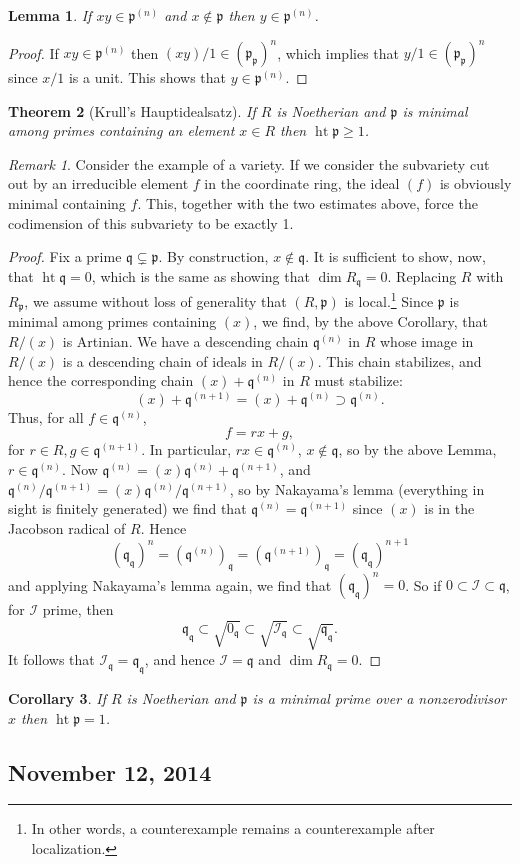 \documentclass{article}
\newcommand{\fr}{\mathfrak}
\DeclareMathOperator{\hgt}{ht}
\theoremstyle{plain}
\newtheorem{thm}{Theorem}
\newtheorem{lem}[thm]{Lemma}
\newtheorem{cor}[thm]{Corollary}
\theoremstyle{definition}
\theoremstyle{remark}
\newtheorem*{rem}{Remark}
\begin{document}
\begin{lem}
    If $xy\in \fr p^{(n)}$ and $x\notin\fr p$ then $y\in\fr p^{(n)}$.
\end{lem}
\begin{proof}
    If $xy\in\fr p^{(n)}$ then $(xy)/1\in(\fr p_{\fr p})^n$, which implies that $y/1\in(\fr p_{\fr p})^n$
    since $x/1$ is a unit. This shows that $y\in\fr p^{(n)}$.
\end{proof}

\begin{thm}[Krull's Hauptidealsatz]
    If $R$ is Noetherian and $\fr p$ is minimal among primes containing an element $x\in R$ then
    $\hgt\fr p\geq 1$.
\end{thm}

\begin{rem}
    Consider the example of a variety. If we consider the subvariety cut out
    by an irreducible element $f$ in the coordinate ring, the ideal $(f)$ is obviously minimal
    containing $f$. This, together with the two estimates above, force the codimension of this
    subvariety to be exactly 1.
\end{rem}

\begin{proof}
    Fix a prime $\fr q\subsetneq\fr p$. By construction, $x\notin\fr q$. It is sufficient to
    show, now, that $\hgt\fr q=0$, which is the same as showing that $\dim R_{\fr q}=0$.
    Replacing $R$ with $R_{\fr p}$, we assume without loss of generality that $(R,\fr p)$ is local.\footnote{In
    other words, a counterexample remains a counterexample after localization.}
    Since $\fr p$ is minimal among primes containing $(x)$, we find, by
    the above Corollary, that $R/(x)$ is Artinian. We have a descending chain $\fr q^{(n)}$ in $R$
    whose image in $R/(x)$ is a descending chain of ideals in $R/(x)$.
    This chain stabilizes, and hence the corresponding chain $(x)+\fr q^{(n)}$ in $R$ must stabilize:
    \[(x)+\fr q^{(n+1)}=(x)+\fr q^{(n)}\supset\fr q^{(n)}.\]
    Thus, for all $f\in\fr q^{(n)}$, \[f=rx+g,\] for $r\in R,g\in\fr q^{(n+1)}$.
    In particular, $rx\in\fr q^{(n)}$, $x\notin\fr q$, so by the above Lemma, $r\in\fr q^{(n)}$.
    Now $\fr q^{(n)}=(x)\fr q^{(n)}+\fr q^{(n+1)}$, and $\fr q^{(n)}/\fr q^{(n+1)}=(x)\fr q^{(n)}/\fr q^{(n+1)}$,
    so by Nakayama's lemma (everything in sight is finitely generated) we find that $\fr q^{(n)}=\fr q^{(n+1)}$
    since $(x)$ is in the Jacobson radical of $R$. Hence
    \[(\fr q_{\fr q})^n=(\fr q^{(n)})_{\fr q}=(\fr q^{(n+1)})_{\fr q}=(\fr q_{\fr q})^{n+1}\]
    and applying Nakayama's lemma again, we find that $(\fr q_{\fr q})^n=0$.
    So if $0\subset\mathcal{I}\subset\fr q$, for $\mathcal{I}$ prime, then 
    \[\fr q_{\fr q}\subset \sqrt{0_{\fr q}}\subset\sqrt{\mathcal{I}_{\fr q}}\subset \sqrt{\fr q_{\fr q}}.\]
    It follows that $\mathcal{I}_{\fr q}=\fr q_{\fr q}$, and hence $\mathcal{I}=\fr q$ and $\dim R_{\fr q}=0$.
\end{proof}

\begin{cor}
    If $R$ is Noetherian and $\fr p$ is a minimal prime over a nonzerodivisor $x$ then $\hgt\fr p=1$.
\end{cor}

\subsection*{November 12, 2014}
\end{document}
